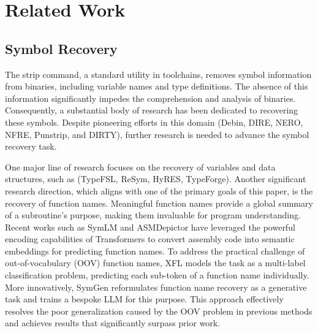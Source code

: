 \documentclass[acmsmall,screen,review,anonymous]{acmart} %
\begin{document}





\section{Related Work}
\subsection{Symbol Recovery}

The strip command, a standard utility in toolchains, removes symbol information from binaries, including variable names and type definitions. The absence of this information significantly impedes the comprehension and analysis of binaries. Consequently, a substantial body of research has been dedicated to recovering these symbols. Despite pioneering efforts in this domain (Debin, DIRE, NERO, NFRE, Punstrip, and DIRTY), further research is needed to advance the symbol recovery task.

One major line of research focuses on the recovery of variables and data structures, such as (TypeFSL, ReSym, HyRES, TypeForge). Another significant research direction, which aligns with one of the primary goals of this paper, is the recovery of function names. Meaningful function names provide a global summary of a subroutine's purpose, making them invaluable for program understanding. Recent works such as SymLM and ASMDepictor have leveraged the powerful encoding capabilities of Transformers to convert assembly code into semantic embeddings for predicting function names. To address the practical challenge of out-of-vocabulary (OOV) function names, XFL models the task as a multi-label classification problem, predicting each sub-token of a function name individually. More innovatively, SymGen reformulates function name recovery as a generative task and trains a bespoke LLM for this purpose. This approach effectively resolves the poor generalization caused by the OOV problem in previous methods and achieves results that significantly surpass prior work.
\end{document}
